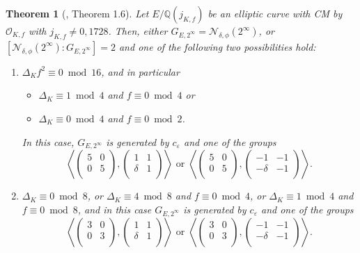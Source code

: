 \documentclass[11pt]{amsart}
\newtheorem{thm}[defn]{Theorem}
\theoremstyle{definition}
\newcommand{\Q}{\mathbb{Q}}
\newcommand{\OO}{\mathcal{O}}
\begin{document}
\begin{thm}[\cite{lozano-galoiscm}, Theorem 1.6]\label{thm-m8and16alvaro}
	Let $E/\Q(j_{K,f})$ be an elliptic curve with CM by $\OO_{K,f}$ with $j_{K,f}\neq 0, 1728$. Then, either $G_{E,2^{\infty}} = \mathcal{N}_{\delta, \phi}(2^{\infty})$, or $[\mathcal{N}_{\delta, \phi}(2^{\infty}) :  G_{E,2^{\infty}}] = 2$ and one of the following two possibilities hold:
	\begin{enumerate} 
		\item $\Delta_K f^2 \equiv 0 \bmod 16$, and in particular
        \begin{itemize}
         \item $\Delta_K \equiv 1 \bmod 4$ and $f \equiv 0 \bmod 4$ or 
         \item $\Delta_K \equiv 0 \bmod 4$ and $f \equiv 0 \bmod 2$. \end{itemize}
      In this case, $G_{E,2^{\infty}}$ is generated by $c_{\varepsilon}$ and one of the groups
			\[ \left\langle \left(\begin{array}{cc} 5 & 0\\ 0 & 5\\\end{array}\right),\left(\begin{array}{cc} 1 & 1\\ \delta & 1\\\end{array}\right)\right\rangle \text{ or }\left\langle \left(\begin{array}{cc} 5 & 0\\ 0 & 5\\\end{array}\right),\left(\begin{array}{cc} -1 & -1\\ -\delta & -1\\\end{array}\right)\right\rangle.\]
		\item $\Delta_K\equiv 0 \bmod 8$, or $\Delta_K\equiv 4 \bmod 8$ and $f\equiv 0 \bmod 4$, or $\Delta_K\equiv 1 \bmod 4$ and $f\equiv 0 \bmod 8$, and in this case $G_{E,2^{\infty}}$ is generated by $c_{\varepsilon}$ and one of the groups
			\[ \left\langle \left(\begin{array}{cc} 3 & 0\\ 0 & 3\\\end{array}\right),\left(\begin{array}{cc} 1 & 1\\ \delta & 1\\\end{array}\right)\right\rangle \text{ or } \left\langle \left(\begin{array}{cc} 3 & 0\\ 0 & 3\\\end{array}\right),\left(\begin{array}{cc} -1 & -1\\ -\delta & -1\\\end{array}\right)\right\rangle.\]

\end{enumerate}
\end{thm}
\end{document}
